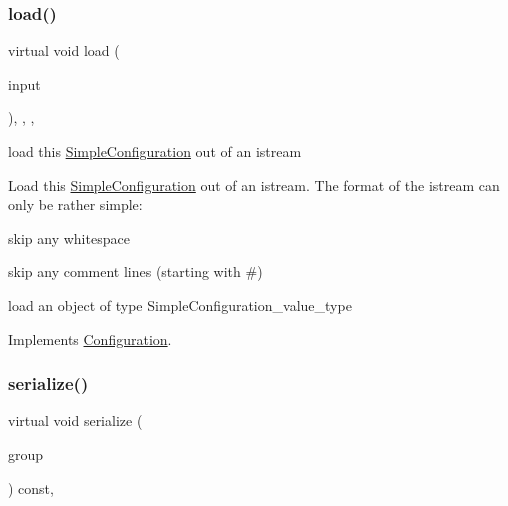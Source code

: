 \subsubsection{\texorpdfstring{load()}{load()}}
{\footnotesize\ttfamily virtual void load (\begin{DoxyParamCaption}\item[{std\+::istream \&}]{input }\end{DoxyParamCaption})\hspace{0.3cm}{\ttfamily [inline]}, {\ttfamily [override]}, {\ttfamily [protected]}, {\ttfamily [virtual]}}



load this \mbox{\hyperlink{class_s_m_spp__di__unipi__it_1_1_simple_configuration}{Simple\+Configuration}} out of an istream 

Load this \mbox{\hyperlink{class_s_m_spp__di__unipi__it_1_1_simple_configuration}{Simple\+Configuration}} out of an istream. The format of the istream can only be rather simple\+:
\begin{DoxyItemize}
\item skip any whitespace
\item skip any comment lines (starting with \textquotesingle{}\#\textquotesingle{})
\item load an object of type Simple\+Configuration\+\_\+value\+\_\+type 
\end{DoxyItemize}

Implements \mbox{\hyperlink{class_s_m_spp__di__unipi__it_1_1_configuration_a27ae9e4279482d52342c7958c34a43c6}{Configuration}}.

\mbox{\label{class_s_m_spp__di__unipi__it_1_1_simple_configuration_a8a626d908100f4419905d89f771150aa}} 
\subsubsection{\texorpdfstring{serialize()}{serialize()}}
{\footnotesize\ttfamily virtual void serialize (\begin{DoxyParamCaption}\item[{net\+C\+D\+F\+::\+Nc\+Group \&\&}]{group }\end{DoxyParamCaption}) const\hspace{0.3cm}{\ttfamily [override]}, {\ttfamily [virtual]}}



